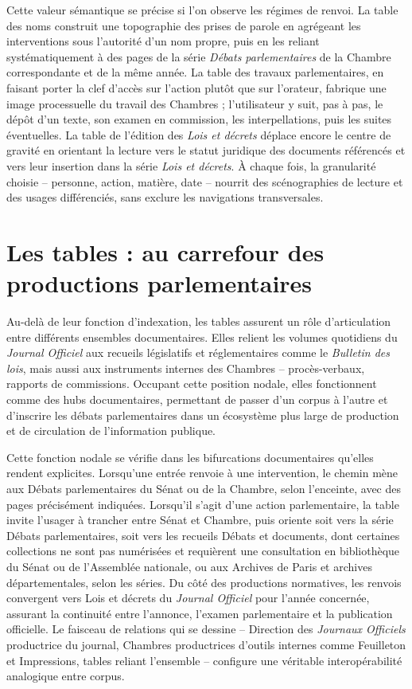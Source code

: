 Cette valeur sémantique se précise si l’on observe les régimes de renvoi. La table des noms construit une topographie des prises de parole en agrégeant les interventions sous l’autorité d’un nom propre, puis en les reliant systématiquement à des pages de la série \emph{Débats parlementaires} de la Chambre correspondante et de la même année. La table des travaux parlementaires, en faisant porter la clef d’accès sur l’action plutôt que sur l’orateur, fabrique une image processuelle du travail des Chambres ; l’utilisateur y suit, pas à pas, le dépôt d’un texte, son examen en commission, les interpellations, puis les suites éventuelles. La table de l’édition des \emph{Lois et décrets} déplace encore le centre de gravité en orientant la lecture vers le statut juridique des documents référencés et vers leur insertion dans la série \emph{Lois et décrets}. À chaque fois, la granularité choisie – personne, action, matière, date – nourrit des scénographies de lecture et des usages différenciés, sans exclure les navigations transversales.

\section{Les tables : au carrefour des productions parlementaires}

Au-delà de leur fonction d’indexation, les tables assurent un rôle d’articulation entre différents ensembles documentaires. Elles relient les volumes quotidiens du \emph{Journal Officiel} aux recueils législatifs et réglementaires comme le \emph{Bulletin des lois}, mais aussi aux instruments internes des Chambres – procès-verbaux, rapports de commissions. Occupant cette position nodale, elles fonctionnent comme des hubs documentaires, permettant de passer d’un corpus à l’autre et d’inscrire les débats parlementaires dans un écosystème plus large de production et de circulation de l’information publique.

Cette fonction nodale se vérifie dans les bifurcations documentaires qu’elles rendent explicites. Lorsqu’une entrée renvoie à une intervention, le chemin mène aux Débats parlementaires du Sénat ou de la Chambre, selon l’enceinte, avec des pages précisément indiquées. Lorsqu’il s’agit d’une action parlementaire, la table invite l’usager à trancher entre Sénat et Chambre, puis oriente soit vers la série Débats parlementaires, soit vers les recueils Débats et documents, dont certaines collections ne sont pas numérisées et requièrent une consultation en bibliothèque du Sénat ou de l’Assemblée nationale, ou aux Archives de Paris et archives départementales, selon les séries. Du côté des productions normatives, les renvois convergent vers Lois et décrets du \emph{Journal Officiel} pour l’année concernée, assurant la continuité entre l’annonce, l’examen parlementaire et la publication officielle. Le faisceau de relations qui se dessine – Direction des \emph{Journaux Officiels} productrice du journal, Chambres productrices d’outils internes comme Feuilleton et Impressions, tables reliant l’ensemble – configure une véritable interopérabilité analogique entre corpus.

